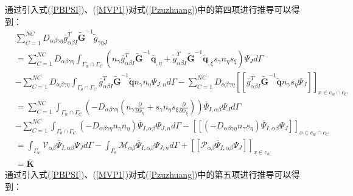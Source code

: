 通过引入式(\ref{PBPSI})、(\ref{MVP1})对式(\ref{Pzuzhuang})中的第四项进行推导可以得到：
\begin{equation}
\begin{split}
    &\sum_{C=1}^{N\!C}D_{\alpha\beta\gamma\eta}\bar{g}_{\alpha\beta I}^T\tilde{\pmb G}^{-1}\tilde{g}_{\gamma\eta J}\\
    &=\sum_{C=1}^{N\!C}D_{\alpha\beta\gamma\eta}\int_{{\Gamma_w}\cap{\Gamma_C}}(n_{\gamma}
    \bar{g}_{\alpha\beta I}^T\tilde{\pmb G}^{-1}\bar{\pmb q}_{,\eta}+\tilde{g}_{\alpha\beta I}^T
    \tilde{\pmb G}^{-1}\tilde{\pmb q}_{,\xi}s_{\gamma}n_{\eta}s_{\xi})\Psi_Jd\Gamma\\
    &-\sum_{C=1}^{N\!C}D_{\alpha\beta\gamma\eta}\int_{{\Gamma_{\theta}}\cap{\Gamma_C}}
    \bar{g}_{\alpha\beta I}^T\tilde{\pmb G}^{-1}\tilde{\pmb q}n_{\gamma}n_{
    \eta}\Psi_{J,n}d\Gamma
    -\sum_{C=1}^{N\!C}D_{\alpha\beta\gamma\eta}[[\bar{g}_{\alpha\beta I}^T\tilde{\pmb G}^{-1}\tilde{\pmb q}n_{\gamma}s_{\eta}\Psi_J]]_{x\in{c_w}\cap{c_C}}\\
    &=\sum_{C=1}^{N\!C}\int_{{\Gamma_w}\cap{\Gamma_C}}(-D_{\alpha\beta\gamma\eta}(n_{\gamma}\frac{\partial}{\partial x_{\eta}}+s_{\gamma}n_{\eta}s_{\xi}\frac{\partial}{\partial x_{\xi}}))\bar{\Psi}_{I,\alpha\beta}\Psi_Jd\Gamma\\
    &-\sum_{C=1}^{N\!C}\int_{{\Gamma_{\theta}}\cap{\Gamma_C}}(-D_{\alpha\beta\gamma\eta}n_{\gamma}n_{\eta})\bar{\Psi}_{I,\alpha\beta}\Psi_{J,n}d\Gamma
    -[[(-D_{\alpha\beta\gamma\eta}n_{\gamma}s_{\eta})\bar{\Psi}_{I,\alpha\beta}\Psi_J]]_{x\in{c_w}\cap{c_C}}\\
    &=\int_{\Gamma_w}\mathcal{V}_{\alpha\beta}\bar{\Psi}_{I,\alpha\beta}\Psi_Jd\Gamma-\int_{\Gamma_{\theta}}\mathcal{M}_{\alpha\beta}\bar{\Psi}_{I,\alpha\beta}\Psi_{J,n}d\Gamma+[[\mathcal{P}_{\alpha\beta}\bar{\Psi}_{I,\alpha\beta}\Psi_J]]_{x\in{c_w}}\\
    &=\bar{\pmb K}
\end{split}
\end{equation}
通过引入式(\ref{PBPSI})、(\ref{MVP1})对式(\ref{Pzuzhuang})中的第五项进行推导可以得到：
